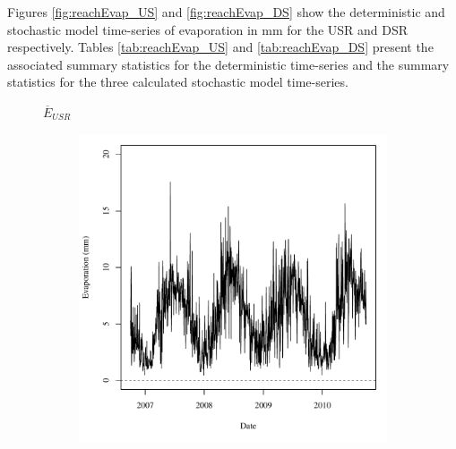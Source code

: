 \begin{linenumbers}
Figures \ref{fig:reachEvap_US} and \ref{fig:reachEvap_DS} show the deterministic and stochastic model time-series of evaporation in \si{\milli\meter} for the USR and DSR respectively.  Tables \ref{tab:reachEvap_US} and \ref{tab:reachEvap_DS} present the associated summary statistics for the deterministic time-series and the summary statistics for the three calculated stochastic model time-series.

\subfiguretop
\begin{landscape}
	\begin{figure}
		\centering
		$ \displaystyle \overline{E}_{USR} $
		\begin{subfigure}{0.7\textwidth}
			\centering
			\includegraphics[width=\tableCustomSize]{"Figures/Results_USR/Deterministic/A Evap"}
		\end{subfigure}%
		\begin{subfigure}{0.7\textwidth}
			\centering

\end{subfigure}
\end{figure}
\end{landscape}
\end{linenumbers}
